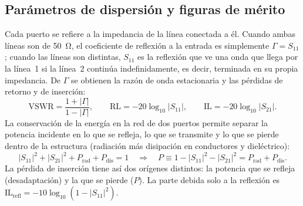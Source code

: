 \subsection{Parámetros de dispersión y figuras de mérito}
\label{sec:sparam}
Cada puerto se refiere a la impedancia de la línea conectada a él. Cuando ambas líneas son de \SI{50}{\ohm}, el coeficiente de reflexión a la entrada es simplemente $\Gamma=S_{11}$; cuando las líneas son distintas, $S_{11}$ es la reflexión que ve una onda que llega por la línea~1 si la línea~2 continúa indefinidamente, es decir, terminada en su propia impedancia. De $\Gamma$ se obtienen la razón de onda estacionaria y las pérdidas de retorno y de inserción:
\begin{equation}
\mathrm{VSWR} = \frac{1+|\Gamma|}{1-|\Gamma|}, \qquad
\mathrm{RL} = -20\log_{10}|S_{11}|, \qquad
\mathrm{IL} = -20\log_{10}|S_{21}|.
\label{eq:merito}
\end{equation}
La conservación de la energía en la red de dos puertos permite separar la potencia incidente en lo que se refleja, lo que se transmite y lo que se pierde dentro de la estructura (radiación más disipación en conductores y dieléctrico):
\begin{equation}
|S_{11}|^2 + |S_{21}|^2 + P_{\mathrm{rad}} + P_{\mathrm{dis}} = 1
\quad\Longrightarrow\quad
P \equiv 1-|S_{11}|^2-|S_{21}|^2 = P_{\mathrm{rad}} + P_{\mathrm{dis}}.
\label{eq:balance}
\end{equation}
La pérdida de inserción tiene así dos orígenes distintos: la potencia que se refleja (desadaptación) y la que se pierde ($P$). La parte debida solo a la reflexión es $\mathrm{IL}_{\mathrm{refl}}=-10\log_{10}\left(1-|S_{11}|^2\right)$.
